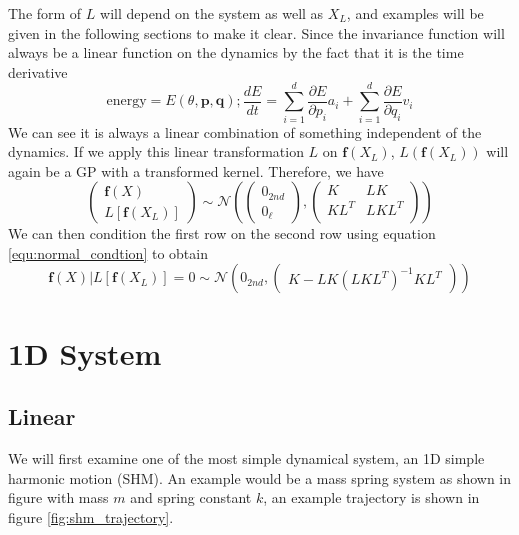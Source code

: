 \documentclass{statsmsc}
\begin{document}
The form of $L$ will depend on the system as well as $X_L$, and examples will be given in the following sections to make it clear.
Since the invariance function will always be a linear function on the dynamics by the fact that it is the time derivative
$$
\text{energy}=E(\theta, \mathbf{p}, \mathbf{q});  \frac{dE}{dt}= \sum_{i=1}^d \frac{\partial E}{\partial p_i} a_i + \sum_{i=1}^d\frac{\partial E}{\partial q_i} v_i
$$
We can see it is always a linear combination of something independent of the dynamics.
If we apply this linear transformation $L$ on $\mathbf{f}(X_L)$, $L(\mathbf{f}(X_L))$ will again be a GP with a transformed kernel.
Therefore, we have 
$$\begin{pmatrix}
\mathbf{f}(X)\\L[\mathbf{f}(X_L)]
\end{pmatrix}
\sim\mathcal{N}
\left(\begin{pmatrix}0_{2nd}\\0_{\ell}\end{pmatrix}, \begin{pmatrix}
    K & LK \\
    KL^T & LKL^T\\
\end{pmatrix}\right)
$$
We can then condition the first row on the second row using equation \ref{equ:normal_condtion} to obtain
\begin{equation}
  \mathbf{f}(X)|L[\mathbf{f}(X_L)]=0 \sim \mathcal{N} \left(0_{2nd}, \begin{pmatrix}
    K-LK(LKL^T)^{-1}KL^T
  \end{pmatrix}\right)
  \label{equ:invariance_condition}
\end{equation}

\section{1D System}
\subsection{Linear}
We will first examine one of the most simple dynamical system, an 1D simple harmonic motion (SHM). 
An example would be a mass spring system as shown in figure with mass $m$ and spring constant $k$, an example trajectory is shown in figure \ref{fig:shm_trajectory}. 
\end{document}
